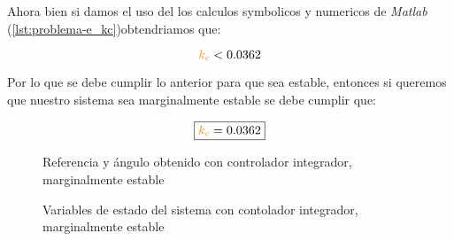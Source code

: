 Ahora bien si damos el uso del los calculos symbolicos y numericos de \textit{Matlab} (\autoref{lst:problema-e_kc})obtendriamos que: 

\begin{equation}
  \nara{k_c} < 0.0362
\end{equation}

Por lo que se debe cumplir lo anterior para que sea estable, entonces si queremos que nuestro sistema sea marginalmente estable se debe cumplir que:

\begin{equation}
  \boxed{\nara{k_c} = 0.0362}
\end{equation}

\begin{figure}[h]
  \centering
  
  \caption{Referencia y ángulo obtenido con controlador integrador, marginalmente estable}\label{fig:psi-marge-int}
\end{figure}

\begin{figure}[h]
  \centering
  
  \caption{Variables de estado del sistema con contolador integrador, marginalmente estable}\label{fig:estado-marge-int}
\end{figure}


